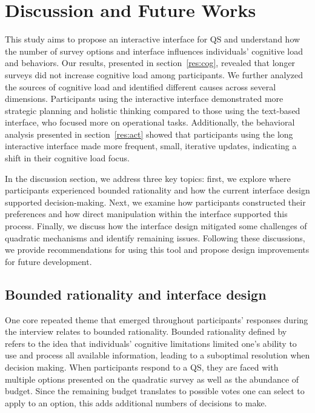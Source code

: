 \section{Discussion and Future Works}
\label{sec:discussion}
This study aims to propose an interactive interface for QS and understand how the number of survey options and interface influences individuals' cognitive load and behaviors. Our results, presented in section~\ref{res:cog}, revealed that longer surveys did not increase cognitive load among participants. We further analyzed the sources of cognitive load and identified different causes across several dimensions. Participants using the interactive interface demonstrated more strategic planning and holistic thinking compared to those using the text-based interface, who focused more on operational tasks. Additionally, the behavioral analysis presented in section~\ref{res:act} showed that participants using the long interactive interface made more frequent, small, iterative updates, indicating a shift in their cognitive load focus.

In the discussion section, we address three key topics: first, we explore where participants experienced bounded rationality and how the current interface design supported decision-making. Next, we examine how participants constructed their preferences and how direct manipulation within the interface supported this process. Finally, we discuss how the interface design mitigated some challenges of quadratic mechanisms and identify remaining issues. Following these discussions, we provide recommendations for using this tool and propose design improvements for future development.


\subsection{Bounded rationality and interface design}
One core repeated theme that emerged throughout participants' responses during the interview relates to bounded rationality. Bounded rationality defined by~\textcite{simonBehavioralModelRational1955} refers to the idea that individuals' cognitive limitations limited one's ability to use and process all available information, leading to a suboptimal resolution when decision making. When participants respond to a QS, they are faced with multiple options presented on the quadratic survey as well as the abundance of budget. Since the remaining budget translates to possible votes one can select to apply to an option, this adds additional numbers of decisions to make.

